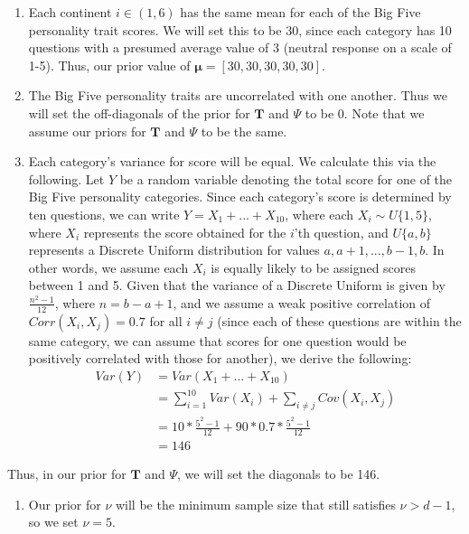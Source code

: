 \documentclass[
]{article}
\providecommand{\tightlist}{%
  \setlength{\itemsep}{0pt}\setlength{\parskip}{0pt}}
\begin{document}
\begin{enumerate}
\def\labelenumi{\arabic{enumi}.}
\tightlist
\item
  Each continent \(i \in (1, 6)\) has the same mean for each of the Big
  Five personality trait scores. We will set this to be 30, since each
  category has 10 questions with a presumed average value of 3 (neutral
  response on a scale of 1-5). Thus, our prior value of
  \(\boldsymbol \mu = [30, 30, 30, 30, 30]\).
\item
  The Big Five personality traits are uncorrelated with one another.
  Thus we will set the off-diagonals of the prior for \(\mathbf T\) and
  \(\Psi\) to be 0. Note that we assume our priors for \(\mathbf T\) and
  \(\Psi\) to be the same.
\item
  Each category's variance for score will be equal. We calculate this
  via the following. Let \(Y\) be a random variable denoting the total
  score for one of the Big Five personality categories. Since each
  category's score is determined by ten questions, we can write
  \(Y = X_1 + ... + X_{10}\), where each \(X_i \sim U\{1,5\}\), where
  \(X_i\) represents the score obtained for the \(i\)'th question, and
  \(U\{a,b\}\) represents a Discrete Uniform distribution for values
  \(a, a+1, ..., b-1, b\). In other words, we assume each \(X_i\) is
  equally likely to be assigned scores between 1 and 5. Given that the
  variance of a Discrete Uniform is given by \(\frac{n^2 - 1}{12}\),
  where \(n = b - a + 1\), and we assume a weak positive correlation of
  \(Corr(X_i, X_j) = 0.7\) for all \(i \neq j\) (since each of these
  questions are within the same category, we can assume that scores for
  one question would be positively correlated with those for another),
  we derive the following: \[
  \begin{aligned}
  Var(Y) &= Var(X_1 + ... + X_{10})\\
  &= \sum_{i=1}^{10} Var(X_i) + \sum_{i \neq j} Cov(X_i, X_j)\\
  &= 10 * \frac{5^2-1}{12} + 90 * 0.7 * \frac{5^2-1}{12}\\
  &= 146
  \end{aligned}
  \]
\end{enumerate}

Thus, in our prior for \(\mathbf T\) and \(\Psi\), we will set the
diagonals to be 146.

\begin{enumerate}
\def\labelenumi{\arabic{enumi}.}
\setcounter{enumi}{3}
\tightlist
\item
  Our prior for \(\nu\) will be the minimum sample size that still
  satisfies \(\nu > d - 1\), so we set \(\nu = 5\).
\end{enumerate}
\end{document}
